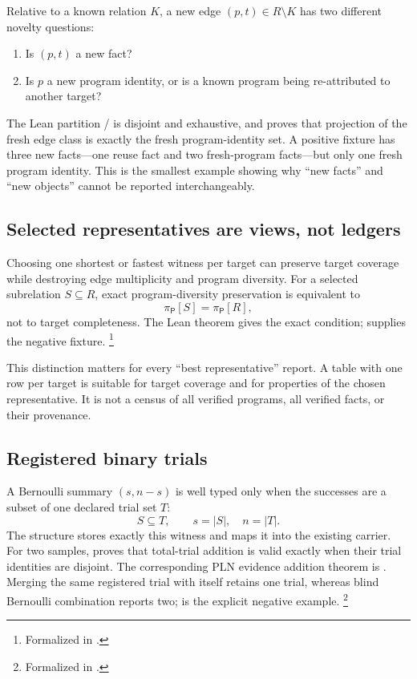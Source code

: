 \documentclass[11pt,openany]{report}
\begin{document}
Relative to a known relation $K$, a new edge $(p,t)\in R\setminus K$ has two
different novelty questions:
\begin{enumerate}
\item Is $(p,t)$ a new fact?
\item Is $p$ a new program identity, or is a known program being re-attributed
  to another target?
\end{enumerate}
The Lean partition
/ is disjoint and
exhaustive, and
 proves that projection of the fresh
edge class is exactly the fresh program-identity set.  A positive fixture has
three new facts---one reuse fact and two fresh-program facts---but only one
fresh program identity.  This is the smallest example showing why ``new
facts'' and ``new objects'' cannot be reported interchangeably.

\subsection{Selected representatives are views, not ledgers}

Choosing one shortest or fastest witness per target can preserve target
coverage while destroying edge multiplicity and program diversity.  For a
selected subrelation $S\subseteq R$, exact program-diversity preservation is
equivalent to
\[
  \pi_{\mathsf P}[S]=\pi_{\mathsf P}[R],
\]
not to target completeness.  The Lean theorem
 gives the exact condition;
 supplies the negative
fixture.%
\footnote{Formalized in
.}

This distinction matters for every ``best representative'' report.  A table
with one row per target is suitable for target coverage and for properties of
the chosen representative.  It is not a census of all verified programs,
all verified facts, or their provenance.

\subsection{Registered binary trials}

A Bernoulli summary $(s,n-s)$ is well typed only when the successes are a
subset of one declared trial set $T$:
\[
  S\subseteq T,\qquad s=|S|,\quad n=|T|.
\]
The structure  stores exactly this witness and maps
it into the existing  carrier.  For two samples,
 proves that total-trial addition is valid
exactly when their trial identities are disjoint.  The corresponding PLN
evidence addition theorem is
.  Merging the same registered trial with
itself retains one trial, whereas blind Bernoulli combination reports two;
 is the explicit negative
example.%
\footnote{Formalized in
.}
\end{document}
